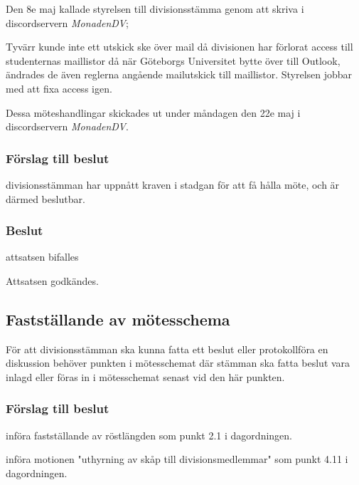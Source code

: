 \documentclass[protokoll]{dvd}
\begin{document}
Den 8e maj kallade styrelsen till divisionsstämma genom att skriva i discordservern \emph{MonadenDV};

Tyvärr kunde inte ett utskick ske över mail då divisionen har förlorat
access till studenternas maillistor då när Göteborgs Universitet
bytte över till Outlook, ändrades de även reglerna angående mailutskick
till maillistor. Styrelsen jobbar med att fixa access igen.

Dessa möteshandlingar skickades ut under måndagen den 22e maj i discordservern \emph{MonadenDV}.

\subsubsection*{Förslag till beslut}

\begin{attsatser}
    \item divisionsstämman har uppnått kraven i stadgan för att få hålla möte, och är därmed beslutbar.
\end{attsatser}

\subsubsection*{Beslut}

\begin{attsatser}
    \item attsatsen bifalles
\end{attsatser}

Attsatsen godkändes.

\subsection{Fastställande av mötesschema}

För att divisionsstämman ska kunna fatta ett beslut eller protokollföra en diskussion behöver punkten i mötesschemat där stämman ska fatta beslut vara inlagd eller föras in i mötesschemat senast vid den här punkten.

\subsubsection*{Förslag till beslut}

\begin{attsatser}
    \item införa fastställande av röstlängden som punkt 2.1 i dagordningen.
    \item införa motionen "uthyrning av skåp till divisionsmedlemmar" som punkt 4.11 i dagordningen.
\end{attsatser}
\end{document}
